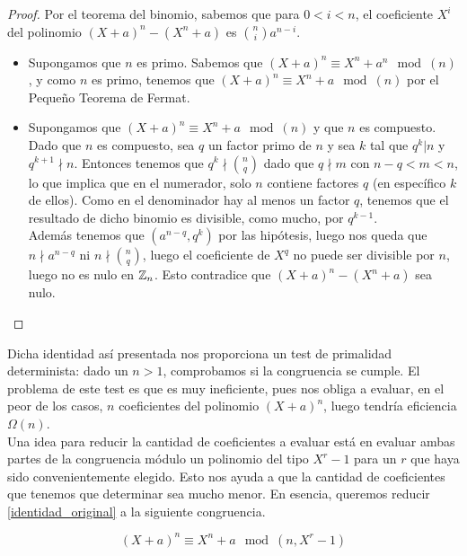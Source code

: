 \begin{proof}
	Por el teorema del binomio, sabemos que para $0 < i < n$, el coeficiente $X^i$ del polinomio $(X + a)^n - (X^n + a)$ es $\binom{n}{i}a^{n-i}$.
	
	\begin{itemize}
		\item Supongamos que $n$ es primo. Sabemos que $(X + a)^n \equiv X^n + a^n \mod(n)$, y como $n$ es primo, tenemos que $(X + a)^n \equiv X^n + a \mod(n)$ por el Pequeño Teorema de Fermat.
		
		\item Supongamos que $(X + a)^n \equiv X^n + a \mod(n)$ y que $n$ es compuesto. Dado que $n$ es compuesto, sea $q$ un factor primo de $n$ y sea $k$ tal que $q^k | n$ y $q^{k+1} \nmid n$. Entonces tenemos que $q^k \nmid \binom{n}{q}$ dado que $q \nmid m$ con $n - q < m < n$, lo que implica que en el numerador, solo $n$ contiene factores $q$ (en específico $k$ de ellos). Como en el denominador hay al menos un factor $q$, tenemos que el resultado de dicho binomio es divisible, como mucho, por $q^{k-1}$.\\
		
		Además tenemos que $(a^{n-q}, q^k)$ por las hipótesis, luego nos queda que $n \nmid a^{n-q}$ ni $n \nmid \binom{n}{q}$, luego el coeficiente de $X^q$ no puede ser divisible por $n$, luego no es nulo en $\mathbb{Z}_n$. Esto contradice que $(X + a)^n - (X^n + a)$ sea nulo.
	\end{itemize}
\end{proof}

Dicha identidad así presentada nos proporciona un test de primalidad determinista: dado un $n > 1$, comprobamos si la congruencia se cumple. El problema de este test es que es muy ineficiente, pues nos obliga a evaluar, en el peor de los casos, $n$ coeficientes del polinomio $(X + a)^n$, luego tendría eficiencia $\Omega(n)$.\\

Una idea para reducir la cantidad de coeficientes a evaluar está en evaluar ambas partes de la congruencia módulo un polinomio del tipo $X^r - 1$ para un $r$ que haya sido convenientemente elegido. Esto nos ayuda a que la cantidad de coeficientes que tenemos que determinar sea mucho menor. En esencia, queremos reducir \eqref{identidad_original} a la siguiente congruencia.

\begin{equation}\label{identidad_con_polinomio}
(X + a)^n \equiv X^n + a \mod(n, X^r - 1)
\end{equation}

